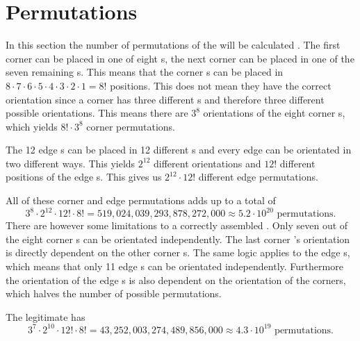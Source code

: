 \section{Permutations}
\label{sec:permutations}
In this section the number of permutations of the \rubik{} will be calculated \cite{rokicki09}. 
The first corner \cpiece{} can be placed in one of eight \cubicle{}s, the next corner \cpiece{} can be placed in one of the seven remaining \cubicle{}s. %
This means that the corner \cpiece{}s can be placed in $8\cdot7\cdot6\cdot5\cdot4\cdot3\cdot2\cdot1=8!$ positions. 
This does not mean they have the correct orientation since a corner \cpiece{} has three different \facelet{}s and therefore three different possible orientations. 
This means there are $3^8$ orientations of the eight corner \cpiece{}s, which yields $8!\cdot3^8$ corner permutations. 


The 12 edge \cpiece{}s can be placed in 12 different \cubicle{}s and every edge \cpiece{} can be orientated in two different ways. 
This yields $2^{12}$ different orientations and $12!$ different positions of the edge \cpiece{}s. 
This gives us $2^{12}\cdot12!$ different edge permutations. 

All of these corner and edge permutations adds up to a total of 
\begin{equation*}
3^8\cdot2^{12}\cdot12!\cdot8!=519,024,039,293,878,272,000 \approx 5.2\cdot10^{20} \text{ permutations.}
\end{equation*}
There are however some limitations to a correctly assembled \rubik{}. 
Only seven out of the eight corner \cpiece{}s can be orientated independently. 
The last corner \cpiece{}'s orientation is directly dependent on the other corner \cpiece{}s. 
The same logic applies to the edge \cpiece{}s, which means that only 11 edge \cpiece{}s can be orientated independently.
Furthermore the orientation of the edge \cpiece{}s is also dependent on the orientation of the corners, which halves the number of possible permutations.

The legitimate \rubik{} has 
\begin{equation*}
3^7\cdot2^{10}\cdot12!\cdot8!=43,252,003,274,489,856,000\approx 4.3\cdot10^{19} \text{ permutations.}
\end{equation*}